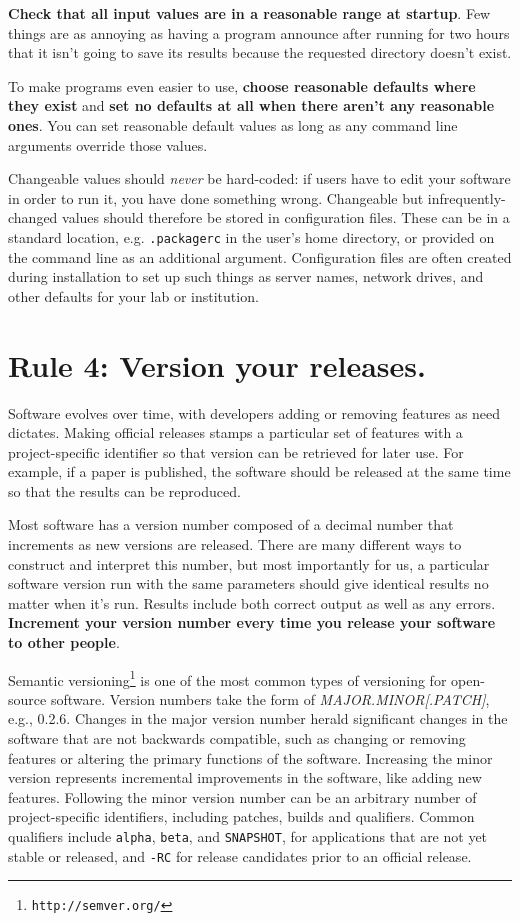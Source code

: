 \documentclass[10pt,letterpaper]{article}
\newcommand{\withurl}[2]{{#1}\footnote{\texttt{#2}}}
\newcommand{\rulemajor}[1]{\section{#1}}
\newcommand{\ruleminor}[1]{\textbf{#1}}
\begin{document}
\ruleminor{Check that all input values are in a reasonable range at
startup}.  Few things are as annoying as having a program announce
after running for two hours that it isn't going to save its results
because the requested directory doesn't exist.

To make programs even easier to use, \ruleminor{choose reasonable
defaults where they exist} and \ruleminor{set no defaults at all
when there aren't any reasonable ones}.  You can set reasonable
default values as long as any command line arguments override those
values.

Changeable values should \emph{never} be hard-coded: if users have to
edit your software in order to run it, you have done something wrong.
Changeable but infrequently-changed values should therefore be stored
in configuration files.  These can be in a standard location,
e.g. \texttt{.packagerc} in the user's home directory, or provided on
the command line as an additional argument.  Configuration files are
often created during installation to set up such things as server
names, network drives, and other defaults for your lab or institution.

\rulemajor{Rule 4: Version your releases.}

Software evolves over time, with developers adding or removing
features as need dictates. Making official releases stamps a
particular set of features with a project-specific identifier so that
version can be retrieved for later use. For example, if a paper is
published, the software should be released at the same time so that
the results can be reproduced.

Most software has a version number composed of a decimal number that
increments as new versions are released.  There are many different
ways to construct and interpret this number, but most importantly for
us, a particular software version run with the same parameters should
give identical results no matter when it's run. Results include both
correct output as well as any errors.  \ruleminor{Increment your
version number every time you release your software to other
people}.

\withurl{Semantic versioning}{http://semver.org/} is one of the most
common types of versioning for open-source software. Version numbers
take the form of \emph{MAJOR.MINOR{[}.PATCH{]}}, e.g., 0.2.6.  Changes
in the major version number herald significant changes in the software
that are not backwards compatible, such as changing or removing
features or altering the primary functions of the software. Increasing
the minor version represents incremental improvements in the software,
like adding new features. Following the minor version number can be an
arbitrary number of project-specific identifiers, including patches,
builds and qualifiers.  Common qualifiers include \texttt{alpha},
\texttt{beta}, and \texttt{SNAPSHOT}, for applications that are not
yet stable or released, and \texttt{-RC} for release candidates prior
to an official release.
\end{document}
